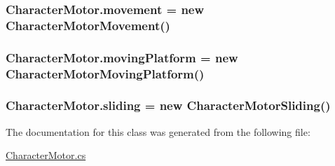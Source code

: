 \subsubsection[{movement}]{ Character\+Motor.\+movement = new {\bf Character\+Motor\+Movement}()}\label{class_character_motor_a4e78119cee0a5fefef9e00fa3e3226e6}
\hypertarget{class_character_motor_a7e1365cba58a6219df462088ee282bbb}{}
\subsubsection[{moving\+Platform}]{ Character\+Motor.\+moving\+Platform = new {\bf Character\+Motor\+Moving\+Platform}()}\label{class_character_motor_a7e1365cba58a6219df462088ee282bbb}
\hypertarget{class_character_motor_acdffbadbd84cdc50a57ae1675166ceb5}{}
\subsubsection[{sliding}]{ Character\+Motor.\+sliding = new {\bf Character\+Motor\+Sliding}()}\label{class_character_motor_acdffbadbd84cdc50a57ae1675166ceb5}


The documentation for this class was generated from the following file\+:\begin{DoxyCompactItemize}
\item 
\hyperlink{_character_motor_8cs}{Character\+Motor.\+cs}\end{DoxyCompactItemize}
